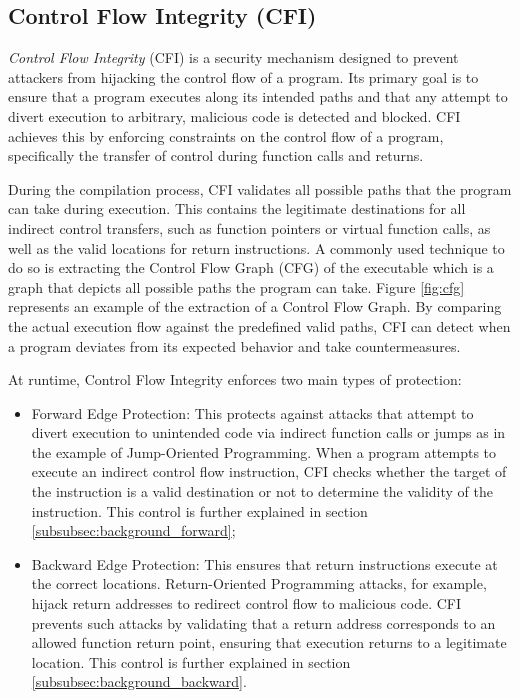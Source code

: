 \subsection{Control Flow Integrity (CFI)}
\label{subsec:background_cfi}

\textit{Control Flow Integrity} (CFI) is a security mechanism designed to
prevent attackers from hijacking the control flow of a program. Its primary goal
is to ensure that a program executes along its intended paths and that any attempt
to divert execution to arbitrary, malicious code is detected and blocked. CFI achieves
this by enforcing constraints on the control flow of a program, specifically the
transfer of control during function calls and returns.

During the compilation process, CFI validates all possible paths that the program
can take during execution. This contains the legitimate destinations for all
indirect control transfers, such as function pointers or virtual function calls,
as well as the valid locations for return instructions. A commonly used technique
to do so is extracting the Control Flow Graph (CFG) of the executable which is a
graph that depicts all possible paths the program can take. Figure \ref{fig:cfg}
represents an example of the extraction of a Control Flow Graph. By comparing the
actual execution flow against the predefined valid paths, CFI can detect when a
program deviates from its expected behavior and take countermeasures.

At runtime, Control Flow Integrity enforces two main types of protection:
\begin{itemize}
  \item Forward Edge Protection: This protects against attacks that attempt to
    divert execution to unintended code via indirect function calls or jumps as
    in the example of Jump-Oriented Programming. When a program attempts to execute
    an indirect control flow instruction, CFI checks whether the target of the
    instruction is a valid destination or not to determine the validity of the
    instruction. This control is further explained in section \ref{subsubsec:background_forward};

  \item Backward Edge Protection: This ensures that return instructions execute
    at the correct locations. Return-Oriented Programming attacks, for example, hijack
    return addresses to redirect control flow to malicious code. CFI prevents
    such attacks by validating that a return address corresponds to an allowed
    function return point, ensuring that execution returns to a legitimate location.
    This control is further explained in section
    \ref{subsubsec:background_backward}.
\end{itemize}

